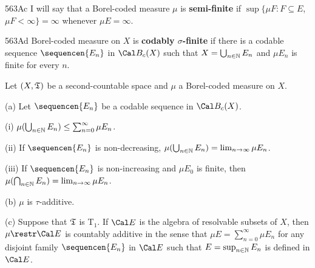 \spheader 563Ac I will say that a Borel-coded measure
$\mu$ is {\bf semi-finite} if
$\sup\{\mu F:F\subseteq E$, $\mu F<\infty\}=\infty$ whenever
$\mu E=\infty$.

\spheader 563Ad  Borel-coded
measure on $X$ is {\bf codably $\sigma$-finite} if there is a codable
sequence
$\sequencen{E_n}$ in $\Cal B_c(X)$ such that $X=\bigcup_{n\in\Bbb N}E_n$
and $\mu E_n$ is finite for every $n$.

 Let $(X,\frak T)$
be a second-countable space and $\mu$ a Borel-coded measure on $X$.

(a) Let $\sequencen{E_n}$ be a codable sequence in $\Cal B_c(X)$.

\quad(i) $\mu(\bigcup_{n\in\Bbb N}E_n)\le\sum_{n=0}^{\infty}\mu E_n$.

\quad(ii) If $\sequencen{E_n}$ is non-decreasing,
$\mu(\bigcup_{n\in\Bbb N}E_n)=\lim_{n\to\infty}\mu E_n$.

\quad(iii) If $\sequencen{E_n}$ is non-increasing and $\mu E_0$ is finite,
then $\mu(\bigcap_{n\in\Bbb N}E_n)=\lim_{n\to\infty}\mu E_n$.

(b) $\mu$ is $\tau$-additive.

(c) Suppose that $\frak T$ is T$_1$.
If $\Cal E$ is the algebra of resolvable subsets of $X$, 
then $\mu\restr\Cal E$ is countably additive in the sense that
$\mu E=\sum_{n=0}^{\infty}\mu E_n$ for any disjoint
family $\sequencen{E_n}$ in $\Cal E$ such that 
$E=\sup_{n\in\Bbb N}E_n$ is defined in $\Cal E$.

